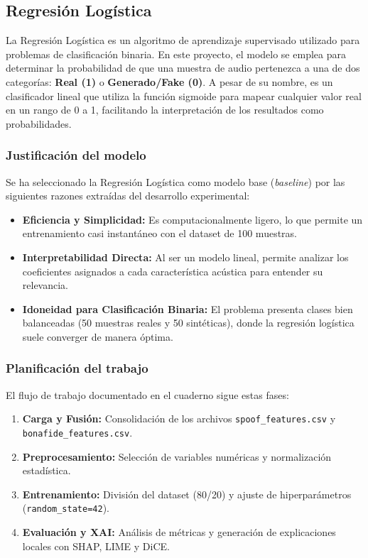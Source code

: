 \subsection{Regresión Logística}

La Regresión Logística es un algoritmo de aprendizaje supervisado utilizado para problemas de clasificación binaria. En este proyecto, el modelo se emplea para determinar la probabilidad de que una muestra de audio pertenezca a una de dos categorías: \textbf{Real (1)} o \textbf{Generado/Fake (0)}. A pesar de su nombre, es un clasificador lineal que utiliza la función sigmoide para mapear cualquier valor real en un rango de 0 a 1, facilitando la interpretación de los resultados como probabilidades.

\subsubsection*{Justificación del modelo}

Se ha seleccionado la Regresión Logística como modelo base (\textit{baseline}) por las siguientes razones extraídas del desarrollo experimental:
\begin{itemize}
    \item \textbf{Eficiencia y Simplicidad:} Es computacionalmente ligero, lo que permite un entrenamiento casi instantáneo con el dataset de 100 muestras.
    \item \textbf{Interpretabilidad Directa:} Al ser un modelo lineal, permite analizar los coeficientes asignados a cada característica acústica para entender su relevancia.
    \item \textbf{Idoneidad para Clasificación Binaria:} El problema presenta clases bien balanceadas (50 muestras reales y 50 sintéticas), donde la regresión logística suele converger de manera óptima.
\end{itemize}

\subsubsection*{Planificación del trabajo}

El flujo de trabajo documentado en el cuaderno sigue estas fases:
\begin{enumerate}
    \item \textbf{Carga y Fusión:} Consolidación de los archivos \texttt{spoof\_features.csv} y \texttt{bonafide\_features.csv}.
    \item \textbf{Preprocesamiento:} Selección de variables numéricas y normalización estadística.
    \item \textbf{Entrenamiento:} División del dataset (80/20) y ajuste de hiperparámetros (\texttt{random\_state=42}).
    \item \textbf{Evaluación y XAI:} Análisis de métricas y generación de explicaciones locales con SHAP, LIME y DiCE.
\end{enumerate}

